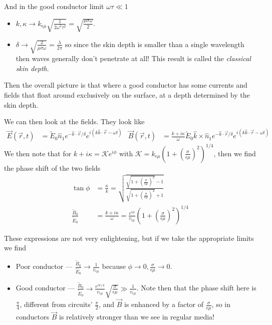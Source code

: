 \documentclass[10pt]{report}
\begin{document}
And in the good conductor limit $\omega \tau \ll 1$
\begin{itemize}
    \item $k, \kappa \to k_{\epsilon\mu}\sqrt{\frac{1}{2\omega^2 \tau^2}} = \sqrt{\frac{\mu \sigma \omega}{2}}$.
    \item $\delta \to \sqrt{\frac{2}{\mu \sigma \omega}} = \frac{\lambda}{2\pi}$ so since the skin depth is smaller than a single wavelength then waves generally don't penetrate at all! This result is called the \emph{classical skin depth}. 
\end{itemize}

Then the overall picture is that where a good conductor has some currents and fields that float around exclusively on the surface, at a depth determined by the skin depth. 

We can then look at the fields. They look like
\begin{align}
    \vec{E}(\vec{r},t) &= \tilde{E}_0 \hat{n}_1 e^{-\hat{k}\cdot \vec{r}/\delta}e^{i(k \hat{k} \cdot \vec{r} - \omega t)} & \vec{B}(\vec{r},t) &= \frac{k + i\kappa}{\omega}\tilde{E}_0 \hat{k} \times \hat{n}_1e^{-\hat{k}\cdot \vec{r}/\delta}e^{i(k \hat{k} \cdot \vec{r} - \omega t)}
\end{align}
We then note that for $k + i\kappa = \mathcal{K}e^{i\phi}$ with $\mathcal{K} = k_{\epsilon \mu}\left( 1 + \left( \frac{\sigma}{\epsilon \mu} \right)^2 \right)^{1/4}$, then we find the phase shift of the two fields
\begin{align}
    \tan \phi &= \frac{\kappa}{k} = \sqrt{\frac{\sqrt{1 + \left( \frac{\sigma}{\epsilon \mu} \right)^2}-1}{\sqrt{1 + \left( \frac{\sigma}{\epsilon \mu} \right)^2}+1}}\\
    \frac{\tilde{B}_0}{\tilde{E}_0} &= \frac{k + i\kappa}{\omega} = \frac{e^{i\phi}}{v_{\epsilon\mu}}\left( 1 + \left( \frac{\sigma}{\epsilon \mu} \right)^2 \right)^{1/4}
\end{align}

These expressions are not very enlightening, but if we take the appropriate limits we find
\begin{itemize}
    \item Poor conductor --- $\frac{\tilde{B}_0}{\tilde{E}_0} \to \frac{1}{v_{\epsilon\mu}}$ because $\phi \to 0, \frac{\sigma}{\epsilon \mu} \to 0$.
    \item Good conductor --- $\frac{\tilde{B}_0}{\tilde{E}_0} \to \frac{e^{i\pi/4}}{v_{\epsilon \mu}}\sqrt{\frac{\sigma}{\epsilon \mu}} \gg \frac{1}{v_{\epsilon \mu}}$. Note then that the phase shift here is $\frac{\pi}{4}$, different from circuits' $\frac{\pi}{2}$, and $\vec{B}$ is enhanced by a factor of $\frac{\sigma}{\epsilon \mu}$, so in conductors $\vec{B}$ is relatively stronger than we see in regular media!
\end{itemize}
\end{document}
